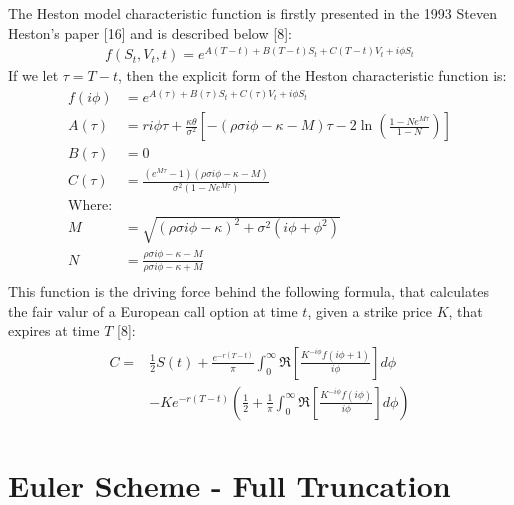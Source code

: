 \documentclass[12pt,twoside]{reedthesis}
\theoremstyle{definition}
\theoremstyle{definition}
\theoremstyle{remark}
\begin{document}
  The Heston model characteristic function is firstly presented in the
  1993 Steven Heston's paper {[}16{]} and is described below {[}8{]}:
  \begin{align}
  f(S_t, V_t, t) = e^{A(T-t)+B(T-t)S_t + C(T-t)V_t + i \phi S_t}
  \end{align}
  If we let \(\tau = T-t\), then the explicit form of the Heston
  characteristic function is:
  \begin{align*}
  f(i \phi) &= e^{A(\tau)+B(\tau)S_t + C(\tau)V_t + i \phi S_t} \\
  A(\tau) &= r i \phi \tau + \frac{\kappa \theta}{\sigma^2} \left[ - (\rho \sigma i \phi - \kappa - M) \tau - 2 \ln\left(\frac{1-N e^{M \tau}}{1-N}\right) \right] \\
  B(\tau) &= 0 \\
  C(\tau) &= \frac{(e^{M \tau}-1)(\rho \sigma i \phi - \kappa - M)}{\sigma^2 (1-N e^{M \tau})} \\
  \text{Where:} & \\
  M &= \sqrt{(\rho \sigma i \phi - \kappa)^2 + \sigma^2 (i \phi + \phi^2)} \\
  N &= \frac{\rho \sigma i \phi - \kappa - M}{\rho \sigma i \phi - \kappa + M} \\
  \end{align*}
  This function is the driving force behind the following formula, that
  calculates the fair valur of a European call option at time \(t\), given
  a strike price \(K\), that expires at time \(T\) {[}8{]}:
  \begin{align} 
  \label{eq:cfheston}
  \begin{split}
  C = & \frac{1}{2} S(t) + \frac{e^{-r(T-t)}}{\pi}\int_{0}^{\infty}{\Re \left[ \frac{K^{-i \phi} f(i \phi + 1)}{i \phi} \right] d\phi} \\
  & -Ke^{-r(T-t)}\left( \frac{1}{2} + \frac{1}{\pi} \int_{0}^{\infty}{\Re \left[ \frac{K^{-i \phi} f(i \phi)}{i \phi} \right]}  d\phi \right)
  \end{split}
  \end{align}
  \section{Euler Scheme - Full
  Truncation}\label{euler-scheme---full-truncation}
  
\end{document}
